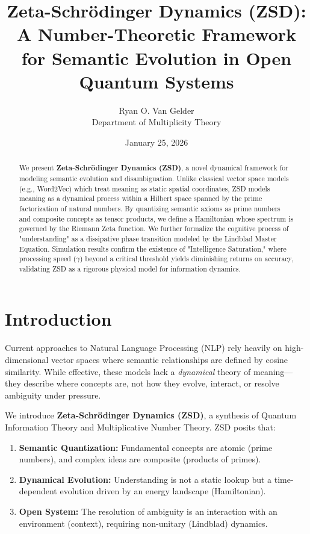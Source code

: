 \documentclass[11pt, a4paper]{article}
\title{\textbf{Zeta-Schrödinger Dynamics (ZSD):\\A Number-Theoretic Framework for Semantic Evolution in Open Quantum Systems}}
\author{Ryan O. Van Gelder \\ \small{Department of Multiplicity Theory}}
\date{January 25, 2026}
\begin{document}
\maketitle

\begin{abstract}
We present \textbf{Zeta-Schrödinger Dynamics (ZSD)}, a novel dynamical framework for modeling semantic evolution and disambiguation. Unlike classical vector space models (e.g., Word2Vec) which treat meaning as static spatial coordinates, ZSD models meaning as a dynamical process within a Hilbert space spanned by the prime factorization of natural numbers. By quantizing semantic axioms as prime numbers and composite concepts as tensor products, we define a Hamiltonian whose spectrum is governed by the Riemann Zeta function. We further formalize the cognitive process of "understanding" as a dissipative phase transition modeled by the Lindblad Master Equation. Simulation results confirm the existence of "Intelligence Saturation," where processing speed ($\gamma$) beyond a critical threshold yields diminishing returns on accuracy, validating ZSD as a rigorous physical model for information dynamics.
\end{abstract}

\section{Introduction}
Current approaches to Natural Language Processing (NLP) rely heavily on high-dimensional vector spaces where semantic relationships are defined by cosine similarity. While effective, these models lack a \textit{dynamical} theory of meaning—they describe where concepts are, not how they evolve, interact, or resolve ambiguity under pressure.

We introduce \textbf{Zeta-Schrödinger Dynamics (ZSD)}, a synthesis of Quantum Information Theory and Multiplicative Number Theory. ZSD posits that:
\begin{enumerate}
    \item \textbf{Semantic Quantization:} Fundamental concepts are atomic (prime numbers), and complex ideas are composite (products of primes).
    \item \textbf{Dynamical Evolution:} Understanding is not a static lookup but a time-dependent evolution driven by an energy landscape (Hamiltonian).
    \item \textbf{Open System:} The resolution of ambiguity is an interaction with an environment (context), requiring non-unitary (Lindblad) dynamics.
\end{enumerate}
\end{document}

